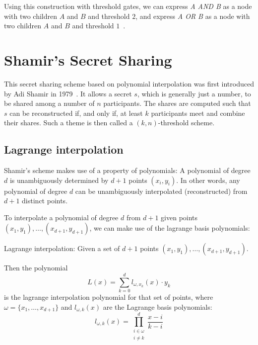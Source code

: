 Using this construction with threshold gates, we can express \emph{A AND B} as a node with two children $A$ and $B$ and threshold $2$, and express \emph{A OR B} as a node with two children $A$ and $B$ and threshold $1$~\cite{yao_lightweight_2015}.

\section{Shamir's Secret Sharing}
This secret sharing scheme based on polynomial interpolation was first introduced by Adi Shamir in 1979~\cite{shamir_how_1979}.
It allows a secret $s$, which is generally just a number, to be shared among a number of $n$ participants.
The shares are computed such that $s$ can be reconstructed if, and only if, at least $k$ participants meet and combine their shares.
Such a theme is then called a $(k,n)$-threshold scheme.~\cite{shamir_how_1979}

\subsection{Lagrange interpolation}
Shamir's scheme makes use of a property of polynomials: A polynomial of degree $d$ is unambiguously determined by $d+1$ points $(x_i, y_i)$.
In other words, any polynomial of degree $d$ can be unambiguously interpolated (reconstructed) from $d+1$ distinct points.

To interpolate a polynomial of degree $d$ from $d+1$ given points $(x_1, y_1), \dots, (x_{d+1}, y_{d+1})$, we can make use of the lagrange basis polynomials:~\cite{yao_lightweight_2015}

\begin{definition}
    Lagrange interpolation: Given a set of $d+1$ points $(x_1, y_1), \dots, (x_{d+1}, y_{d+1})$.

    Then the polynomial 
    \begin{equation}
        L(x) = \sum_{k=0}^d l_{\omega, x_k}(x) \cdot y_k
    \end{equation}
    is the lagrange interpolation polynomial for that set of points, where $\omega = \{x_1, \dots, x_{d+1}\}$ and $l_{\omega,k}(x)$ are the Lagrange basis polynomials:
    \begin{equation}
        l_{\omega,k}(x) = \prod_{\substack{i\in\omega\\ i \neq k}}^d \frac{x-i}{k-i}
    \end{equation}
\end{definition}

